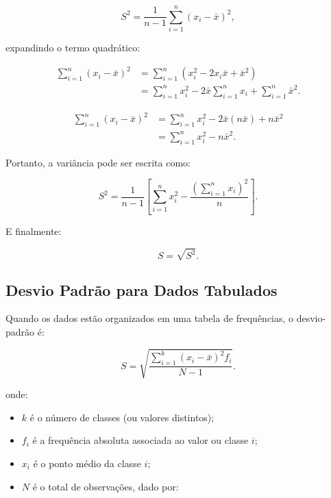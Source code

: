 \begin{equation}
S^{2}=\frac{1}{n-1}\sum_{i=1}^{n}(x_i-\bar{x})^{2},
\end{equation}

expandindo o termo quadrático:

\begin{align}
\sum_{i=1}^{n}(x_i-\bar{x})^{2}
&=\sum_{i=1}^{n}(x_i^{2}-2x_i\bar{x}+\bar{x}^{2}) \\[0.2cm]
&=\sum_{i=1}^{n}x_i^{2}
-2\bar{x}\sum_{i=1}^{n}x_i
+\sum_{i=1}^{n}\bar{x}^{2}.
\end{align}


\begin{align}
\sum_{i=1}^{n}(x_i-\bar{x})^{2}
&=\sum_{i=1}^{n}x_i^{2}
-2\bar{x}(n\bar{x})
+n\bar{x}^{2} \\[0.2cm]
&=\sum_{i=1}^{n}x_i^{2}-n\bar{x}^{2}.
\end{align}

Portanto, a variância pode ser escrita como:

\begin{equation}\label{eq:var_computacional}
S^{2}=
\frac{1}{n-1}
\left[
\sum_{i=1}^{n}x_i^{2}
-\frac{\left(\sum_{i=1}^{n}x_i\right)^{2}}{n}
\right].
\end{equation}


E finalmente:

\begin{equation}
S=\sqrt{S^{2}}.
\end{equation}

\subsection{Desvio Padrão para Dados Tabulados}

Quando os dados estão organizados em uma tabela de frequências, o desvio-padrão é:

\begin{equation}\label{eq:dp_tabulado}
S=
\sqrt{
\frac{\sum_{i=1}^{k}(x_i-\bar{x})^{2}f_i}{N-1}
}.
\end{equation}


onde:
\begin{itemize}
    \item $k$ é o número de classes (ou valores distintos);
    \item $f_i$ é a frequência absoluta associada ao valor ou classe $i$;
    \item $x_i$ é o ponto médio da classe $i$;
    \item $N$ é o total de observações, dado por:
\end{itemize}

